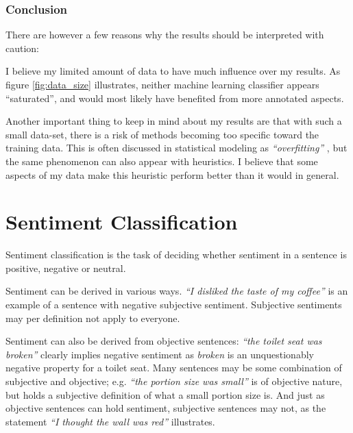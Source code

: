 \documentclass[a4paper,11pt]{kth-mag}
\begin{document}
\subsection{Conclusion}

There are however a few reasons why the results should be interpreted with caution:

I believe my limited amount of data to have much influence over my results.
As figure \ref{fig:data_size} illustrates, neither machine learning classifier
appears ``saturated'', and would most likely have benefited from more annotated aspects.

Another important thing to keep in mind about my results are that with such a small data-set,
there is a risk of methods becoming too specific toward the training data.
This is often discussed in statistical modeling as \emph{``overfitting'' },
but the same phenomenon can also appear with heuristics.
I believe that some aspects of my data make this heuristic perform better than it would in general.








\chapter{Sentiment Classification}
Sentiment classification is the task of deciding whether sentiment in a sentence
is positive, negative or neutral\cite{nlp_book}.


Sentiment can be derived in various ways. \emph{``I disliked the taste of my coffee''}
is an example of a sentence with negative subjective sentiment.
Subjective sentiments may per definition not apply to everyone.

Sentiment can also be derived from objective sentences:
\emph{``the toilet seat was broken''} clearly implies negative sentiment
as \emph{broken} is an unquestionably negative property for a toilet seat.
Many sentences may be some combination of subjective and objective;
e.g. \emph{``the portion size was small''} is of objective nature,
but holds a subjective definition of what a small portion size is.
And just as objective sentences can hold sentiment, subjective sentences may not, as
the statement \emph{``I thought the wall was red''} illustrates.
\end{document}
